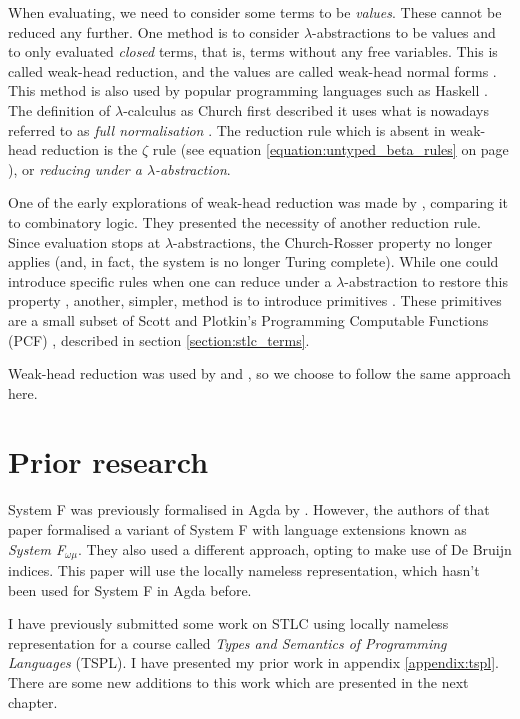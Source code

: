 \documentclass[logo,bsc,singlespacing,parskip,online]{infthesis}
\begin{document}
When evaluating, we need to consider some terms to be \textit{values}. These cannot be reduced any
further. One method is to consider $\lambda$-abstractions to be values and to only evaluated
\textit{closed} terms, that is, terms without any free variables. This is called weak-head
reduction, and the values are called weak-head normal forms \citep{wadler_programming_2022}. This
method is also used by popular programming languages such as Haskell \citep{hutchison_sharing_2005}.
The definition of $\lambda$-calculus as Church first described it uses what is nowadays referred to
as \textit{full normalisation} \citep{wadler_programming_2022}. The reduction rule which is absent in
weak-head reduction is the $\zeta$ rule (see equation \ref{equation:untyped_beta_rules} on page
\pageref{equation:untyped_beta_rules}), or \textit{reducing under a $\lambda$-abstraction}.

One of the early explorations of weak-head reduction was made by \citet{cagman_combinatory_1998},
comparing it to combinatory logic. They presented the necessity of another reduction rule. Since
evaluation stops at $\lambda$-abstractions, the Church-Rosser property no longer applies (and, in
fact, the system is no longer Turing complete). While one could introduce specific rules when one
can reduce under a $\lambda$-abstraction to restore this property \citep{hutchison_sharing_2005},
another, simpler, method is to introduce primitives \citep{wadler_programming_2022}. These
primitives are a small subset of Scott and Plotkin's Programming Computable Functions (PCF)
\citep{plotkin_lcf_1977}, described in section \ref{section:stlc_terms}.

Weak-head reduction was used by \citet{chargueraud_locally_2012} and
\citet[chapter~Lambda]{wadler_programming_2022}, so we choose to follow the same approach here.

\section{Prior research}
System F was previously formalised in Agda by \citet{hutton_system_2019}. However, the authors of
that paper formalised a variant of System F with language extensions known as \textit{System
F$_{\omega \mu}$}. They also used a different approach, opting to make use of De Bruijn indices.
This paper will use the locally nameless representation, which hasn't been used for System F in Agda
before.

I have previously submitted some work on STLC using locally nameless representation for a course
called \textit{Types and Semantics of Programming Languages} (TSPL). I have presented my prior work in
appendix \ref{appendix:tspl}. There are some new additions to this work which are presented in the
next chapter.
\end{document}
